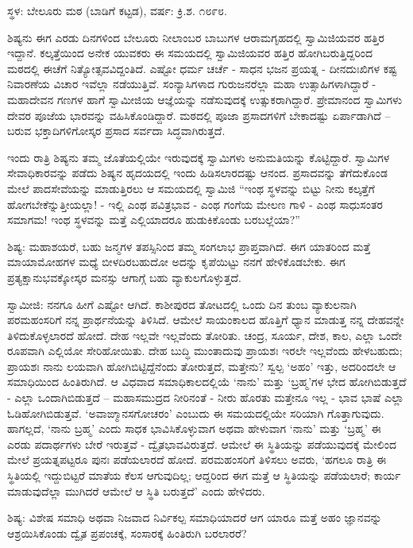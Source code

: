 \centerline{ಸ್ಥಳ: ಬೇಲೂರು ಮಠ (ಬಾಡಿಗೆ ಕಟ್ಟಡ), ವರ್ಷ: ಕ್ರಿ.ಶ. ೧೮೯೮.}

ಶಿಷ್ಯನು ಈಗ ಎರಡು ದಿನಗಳಿಂದ ಬೇಲೂರು ನೀಲಾಂಬರ ಬಾಬುಗಳ ಆರಾಮಗೃಹದಲ್ಲಿ ಸ್ವಾಮಿಜಿಯವರ ಹತ್ತಿರ ಇದ್ದಾನೆ. ಕಲ್ಕತ್ತೆಯಿಂದ ಅನೇಕ ಯುವಕರು ಈ ಸಮಯದಲ್ಲಿ ಸ್ವಾಮಿಜಿಯವರ ಹತ್ತಿರ ಹೋಗಿಬರುತ್ತಿದ್ದರಿಂದ ಮಠದಲ್ಲಿ ಈಚೆಗೆ ನಿತ್ಯೋತ್ಸವವಿದ್ದಂತಿದೆ. ಎಷ್ಟೋ ಧರ್ಮ ಚರ್ಚೆ - ಸಾಧನ ಭಜನ ಪ್ರಯತ್ನ - ದೀನದುಃಖಿಗಳ ಕಷ್ಟ ನಿವಾರಣೆಯ ವಿಚಾರ ಇವೆಲ್ಲಾ ನಡೆಯುತ್ತಿವೆ. ಸಂನ್ಯಾಸಿಗಳಾದ ಗುರುಜನರೆಲ್ಲಾ ಮಹಾ ಉತ್ಸಾಹಿಗಳಾಗಿದ್ದಾರೆ - ಮಹಾದೇವನ ಗಣಗಳ ಹಾಗೆ ಸ್ವಾಮೀಜಿಯ ಆಜ್ಞೆಯನ್ನು ನಡೆಸುವುದಕ್ಕೆ ಉತ್ಸುಕರಾಗಿದ್ದಾರೆ. ಪ್ರೇಮಾನಂದ ಸ್ವಾಮಿಗಳು ದೇವರ ಪೂಜೆಯ ಭಾರವನ್ನು ವಹಿಸಿಕೊಂಡಿದ್ದಾರೆ. ಮಠದಲ್ಲಿ ಪೂಜಾ ಪ್ರಸಾದಗಳಿಗೆ ಬೇಕಾದಷ್ಟು ಏರ್ಪಾಡಾಗಿದೆ – ಬರುವ ಭಕ್ತಾದಿಗಳಿಗೋಸ್ಕರ ಪ್ರಸಾದ ಸರ್ವದಾ ಸಿದ್ಧವಾಗಿರುತ್ತದೆ.

ಇಂದು ರಾತ್ರಿ ಶಿಷ್ಯನು ತಮ್ಮ ಜೊತೆಯಲ್ಲಿಯೇ ಇರುವುದಕ್ಕೆ ಸ್ವಾಮಿಗಳು ಅನುಮತಿಯನ್ನು ಕೊಟ್ಟಿದ್ದಾರೆ. ಸ್ವಾಮಿಗಳ ಸೇವಾಧಿಕಾರವನ್ನು ಪಡೆದು ಶಿಷ್ಯನ ಹೃದಯದಲ್ಲಿ ಇಂದು ಹಿಡಿಸಲಾರದಷ್ಟು ಆನಂದ. ಪ್ರಸಾದವನ್ನು ತೆಗೆದುಕೊಂಡ ಮೇಲೆ ಪಾದಸೇವೆಯನ್ನು ಮಾಡುತ್ತಿರಲು ಆ ಸಮಯದಲ್ಲಿ ಸ್ವಾಮಿಜಿ “ಇಂಥ ಸ್ಥಳವನ್ನು ಬಿಟ್ಟು ನೀನು ಕಲ್ಕತ್ತೆಗೆ ಹೋಗಬೇಕೆನ್ನುತ್ತೀಯಲ್ಲಾ! - ಇಲ್ಲಿ ಎಂಥ ಪವಿತ್ರಭಾವ - ಎಂಥ ಗಂಗೆಯ ಮೇಲಣ ಗಾಳಿ - ಎಂಥ ಸಾಧುಸಂತರ ಸಮಾಗಮ! ಇಂಥ ಸ್ಥಳವನ್ನು ಮತ್ತೆ ಎಲ್ಲಿಯಾದರೂ ಹುಡುಕಿಕೊಂಡು ಬರಬಲ್ಲೆಯಾ?”

ಶಿಷ್ಯ: ಮಹಾಶಯರೆ, ಬಹು ಜನ್ಮಗಳ ತಪಸ್ಸಿನಿಂದ ತಮ್ಮ ಸಂಗಲಾಭ ಪ್ರಾಪ್ತವಾಗಿದೆ. ಈಗ ಯಾತರಿಂದ ಮತ್ತೆ ಮಾಯಾಮೋಹಗಳ ಮಧ್ಯೆ ಬೀಳದಿರಬಹುದೋ ಅದನ್ನು ಕೃಪೆಯಿಟ್ಟು ನನಗೆ ಹೇಳಿಕೊಡಬೇಕು. ಈಗ ಪ್ರತ್ಯಕ್ಷಾನುಭವಕ್ಕೋಸ್ಕರ ಮನಸ್ಸು ಆಗಾಗ್ಗೆ ಬಹು ವ್ಯಾಕುಲಗೊಳ್ಳುತ್ತದೆ.

ಸ್ವಾಮೀಜಿ: ನನಗೂ ಹೀಗೆ ಎಷ್ಟೋ ಆಗಿದೆ. ಕಾಶೀಪುರದ ತೋಟದಲ್ಲಿ ಒಂದು ದಿನ ತುಂಬ ವ್ಯಾಕುಲನಾಗಿ ಪರಮಹಂಸರಿಗೆ ನನ್ನ ಪ್ರಾರ್ಥನೆಯನ್ನು ತಿಳಿಸಿದೆ. ಆಮೇಲೆ ಸಾಯಂಕಾಲದ ಹೊತ್ತಿಗೆ ಧ್ಯಾನ ಮಾಡುತ್ತ ನನ್ನ ದೇಹವನ್ನೇ ತಿಳಿದುಕೊಳ್ಳಲಾರದೆ ಹೋದೆ. ದೇಹ ಇಲ್ಲವೇ ಇಲ್ಲವೆಂದು ತೋರಿತು. ಚಂದ್ರ, ಸೂರ್ಯ, ದೇಶ, ಕಾಲ, ಎಲ್ಲಾ ಒಂದೇ ರೂಪವಾಗಿ ಎಲ್ಲಿಯೋ ಸೇರಿಹೋಯಿತು. ದೇಹ ಬುದ್ಧಿ ಮುಂತಾದುವು ಪ್ರಾಯಶಃ ಇರಲೇ ಇಲ್ಲವೆಂದು ಹೇಳಬಹುದು; ಪ್ರಾಯಶಃ ನಾನು ಲಯವಾಗಿ ಹೋಗಿಬಿಟ್ಟಿದ್ದೆನೆಂದು ತೋರುತ್ತದೆ, ಮತ್ತೇನು? ಸ್ವಲ್ಪ ‘ಅಹಂ’ ಇತ್ತು, ಅದರಿಂದಲೇ ಆ ಸಮಾಧಿಯಿಂದ ಹಿಂತಿರುಗಿದೆ. ಆ ವಿಧವಾದ ಸಮಾಧಿಕಾಲದಲ್ಲಿಯೆ ‘ನಾನು’ ಮತ್ತು ‘ಬ್ರಹ್ಮ’ಗಳ ಭೇದ ಹೋಗಿಬಿಡುತ್ತದೆ - ಎಲ್ಲಾ ಒಂದಾಗಿಬಿಡುತ್ತದೆ – ಮಹಾಸಮುದ್ರದ ನೀರಿನಂತೆ - ನೀರು ಹೊರತು ಮತ್ತೇನೂ ಇಲ್ಲ - ಭಾವ ಭಾಷೆ ಎಲ್ಲಾ ಓಡಿಹೋಗಿಬಿಡುತ್ತವೆ. ‘ಅವಾಙ್ಮಾನಸಗೋಚರಂ’ ಎಂಬುದು ಈ ಸಮಯದಲ್ಲಿಯೇ ಸರಿಯಾಗಿ ಗೊತ್ತಾಗುವುದು. ಹಾಗಲ್ಲದೆ, ‘ನಾನು ಬ್ರಹ್ಮ’ ಎಂದು ಸಾಧಕ ಭಾವಿಸಿಕೊಳ್ಳುವಾಗ ಅಥವಾ ಹೇಳುವಾಗ ‘ನಾನು’ ಮತ್ತು ‘ಬ್ರಹ್ಮ’ ಈ ಎರಡು ಪದಾರ್ಥಗಳು ಬೇರೆ ಇರುತ್ತವೆ - ದ್ವೈತಭಾವವಿರುತ್ತದೆ. ಆಮೇಲೆ ಈ ಸ್ಥಿತಿಯನ್ನು ಪಡೆಯುವುದಕ್ಕೆ ಮೇಲಿಂದ ಮೇಲೆ ಪ್ರಯತ್ನಪಟ್ಟರೂ ಪುನಃ ಪಡೆಯಲಾರದೆ ಹೋದೆ. ಪರಮಹಂಸರಿಗೆ ತಿಳಿಸಲು ಅವರು, ‘ಹಗಲೂ ರಾತ್ರಿ ಈ ಸ್ಥಿತಿಯಲ್ಲಿ ಇದ್ದುಬಿಟ್ಟರೆ ಮಾತೆಯ ಕೆಲಸ ಆಗುವುದಿಲ್ಲ; ಆದ್ದರಿಂದ ಈಗ ಮತ್ತೆ ಆ ಸ್ಥಿತಿಯನ್ನು ಪಡೆಯಲಾರೆ; ಕಾರ್ಯ ಮಾಡುವುದೆಲ್ಲಾ ಮುಗಿದರೆ ಆಮೇಲೆ ಆ ಸ್ಥಿತಿ ಬರುತ್ತದೆ’ ಎಂದು ಹೇಳಿದರು.

ಶಿಷ್ಯ: ವಿಶೇಷ ಸಮಾಧಿ ಅಥವಾ ನಿಜವಾದ ನಿರ್ವಿಕಲ್ಪ ಸಮಾಧಿಯಾದರೆ ಆಗ ಯಾರೂ ಮತ್ತೆ ಅಹಂ ಜ್ಞಾನವನ್ನು ಆಶ್ರಯಿಸಿಕೊಂಡು ದ್ವೈತ ಪ್ರಪಂಚಕ್ಕೆ, ಸಂಸಾರಕ್ಕೆ ಹಿಂತಿರುಗಿ ಬರಲಾರರೆ?

